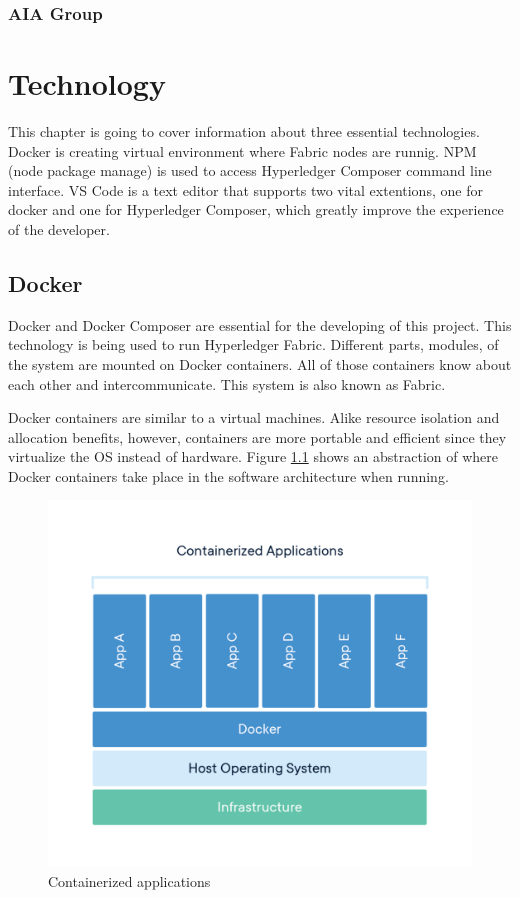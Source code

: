 \documentclass[a4paper,11pt]{report}
\begin{document}
\subsection{AIA Group}


\chapter{Technology}            
\label{technical}

This chapter is going to cover information about three essential technologies. Docker is creating virtual environment where Fabric nodes are runnig. NPM (node package manage) is used to access Hyperledger Composer command line interface. VS Code is a text editor that supports two vital extentions, one for docker and one for Hyperledger Composer, which greatly improve the experience of the developer. 

\section{Docker}
\label{docker}
Docker and Docker Composer are essential for the developing of this project. This technology is being used to run Hyperledger Fabric. Different parts, modules, of the system are mounted on Docker containers. All of those containers know about each other and intercommunicate. This system is also known as Fabric.

	Docker containers are similar to a virtual machines. Alike resource isolation and allocation benefits, however, containers are more portable and efficient since they virtualize the OS instead of hardware.\cite{dockerContainer} Figure \ref{dockerEnvironment} shows an abstraction of where Docker containers take place in the software architecture when running.

\begin{figure}[h]
\centering
  \includegraphics[width = 16cm]{container-what-is-container.png}
  \caption{ Containerized applications \cite{dockerContainer}}
  \label{dockerEnvironment}
\end{figure}
\end{document}
